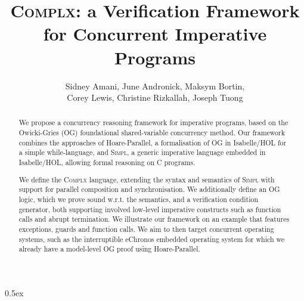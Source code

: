 \documentclass[11pt,a4paper]{article}
\newcommand{\simpl}{\sloppy \textsc{Simpl}}
\newcommand{\complx}{\sloppy \textsc{Complx}}
\begin{document}
\title{\complx: a Verification Framework for Concurrent Imperative Programs}
\author{Sidney Amani, June Andronick, Maksym Bortin,\\
       Corey Lewis, Christine Rizkallah, Joseph Tuong}
\maketitle

\begin{abstract}  
We propose a concurrency reasoning framework for imperative programs, based on
the Owicki-Gries (OG) foundational shared-variable concurrency method.
Our framework combines the approaches of Hoare-Parallel, a formalisation
of OG in Isabelle/HOL for a simple while-language, and \simpl, a generic
imperative language embedded in Isabelle/HOL, allowing formal reasoning
on C programs.

We define the \complx{} language, extending the syntax and semantics of
\simpl{} with support for parallel composition and synchronisation.
We additionally define an OG logic, which we prove sound
w.r.t. the  semantics, and a verification condition generator, 
both supporting involved low-level imperative constructs such as function
calls and abrupt termination. We illustrate our framework on 
an example that features exceptions, guards and function
calls.
We aim to then target concurrent operating systems, such as the
interruptible eChronos embedded operating system for which we already
have a model-level OG proof using Hoare-Parallel.

\end{abstract}

\tableofcontents

\parindent 0pt\parskip 0.5ex


\end{document}
